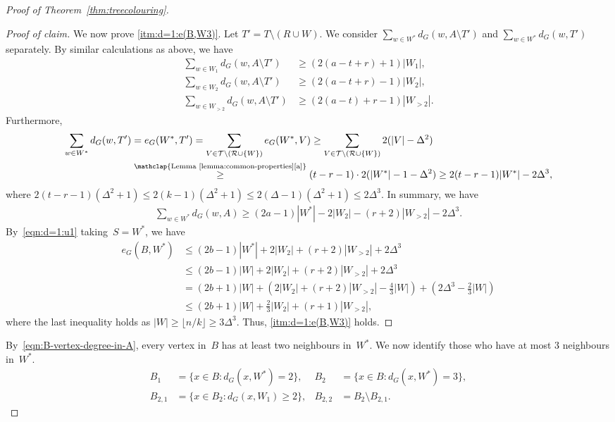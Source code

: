 \documentclass[11pt]{article}
\newenvironment{proofclaim}[1][Proof of claim]{\begin{proof}[#1]\renewcommand*{\qedsymbol}{\(\blacksquare\)}}{\end{proof}}
\theoremstyle{plain}
\numberwithin{equation}{section}
\begin{document}
\begin{proof}[Proof of Theorem~\ref{thm:treecolouring}]
\begin{proofclaim}
We now prove \ref{itm:d=1:e(B,W3)}.
Let $T' = T \setminus (R \cup W)$.
We consider $\sum_{w \in W^*}d_G(w,A \setminus T')$ and $\sum_{w \in W^*}d_G(w,T')$ separately.
By similar calculations as above, we have
\begin{align*}
	\sum_{w \in W_1} d_G(w,A\setminus T') & \ge  \left( 2(a-t+r) + 1 \right) |W_1|,\\
		\sum_{w \in W_2} d_G(w,A \setminus T') & \ge (2(a - t+r) -1 ) |W_2|,\\
		\sum_{w \in W_{>2}} d_G(w,A \setminus T') & \ge (2(a - t)+r -1 ) |W_{>2}|.
\end{align*}
Furthermore,
\begin{align*}
	\sum_{w \in W^*} d_G(w,T') & = e_G(W^*,T')
= \sum_{V \in \mathcal{T} \setminus (\mathcal{R} \cup \{W\}) } e_G(W^*,V) \ge \sum_{V \in \mathcal{T} \setminus (\mathcal{R} \cup \{W\}) } 2(|V| -  \Delta^2) \\
 & \overset{\mathclap{\text{Lemma~\ref{lemma:common-properties}\ref{a}}}}{\ge}
     (t-r-1) \cdot 2(|W^*|-1 - \Delta^2  )
	 \ge 2(t-r-1)|W^*| - 2 \Delta^3,
\end{align*}
where $2( t-r-1 )( \Delta^2 +1 ) \le 2 ( k -1) ( \Delta^2 +1 )  \le 2 (\Delta - 1) ( \Delta^2 +1 ) \le 2 \Delta^3 $.
In summary, we have
\begin{align*}
\sum_{w \in W^*} d_G(w,A) \ge (2a-1) |W^*| - 2 |W_2| -  (r+2)|W_{>2}|-2 \Delta^3.
\end{align*}
By~\eqref{eqn:d=1:u1} taking~$S=W^*$, we have
\begin{align*}
		e_G(B,W^*)  & \le (2b-1) |W^*|  +  2|W_2| + (r+2)|W_{>2}| +2 \Delta^3\\
		& \le (2b-1) |W|  +  2|W_2| + (r+2)|W_{>2}| + 2 \Delta^3\\
		& = (2b+1) |W| + \left( 2|W_2| + (r+2)|W_{>2}|- \frac{4}{3}|W| \right) + \left(2\Delta^3 - \frac23 |W| \right)\\
		& \le  (2b+1) |W| + \frac23 |W_2| + (r+1)|W_{>2}|,
\end{align*}
where the last inequality holds as $|W| \ge \lfloor n/k \rfloor \ge 3\Delta^3$.
Thus, \ref{itm:d=1:e(B,W3)} holds.
\end{proofclaim}

By~\eqref{eqn:B-vertex-degree-in-A}, every vertex in~$B$ has at least two neighbours in~$W^*$.
We now identify those who have at most $3$ neighbours in~$W^*$.
\begin{align*}
	B_1 & =\{x\in B\colon d_G(x,W^*) =2\},  &
	B_2 & =\{x\in B \colon d_G(x,W^*) =3\},\\
	B_{2,1} & =\{x\in B_2 \colon d_G(x,W_1) \ge 2\}, &
	B_{2,2} & = B_2 \setminus B_{2,1}.
\end{align*}


\end{proof}
\end{document}
